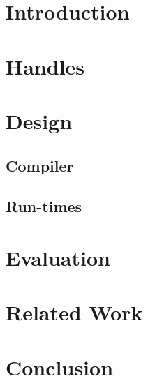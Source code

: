\documentclass[sigplan,screen]{acmart}
\begin{document}
\section{Introduction}
\lipsum[2-4]

\section{Handles}
\lipsum[2-4]

\section{Design}
\lipsum[2-4]
\subsection{Compiler}
\lipsum[2-4]
\subsection{Run-times}
\lipsum[2-4]

\section{Evaluation}
\lipsum[2-4]

\section{Related Work}
\lipsum[1-2]

\section{Conclusion}
\lipsum[1-2]
 
\end{document}
